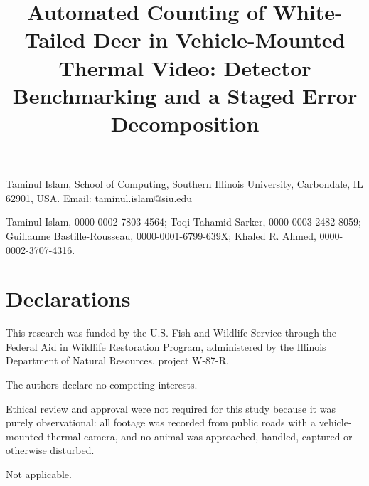 \documentclass[pdflatex,sn-basic,Numbered]{sn-jnl}
\begin{document}
\title[Counting White-Tailed Deer in Vehicle-Mounted Thermal Video]{Automated Counting of White-Tailed Deer in Vehicle-Mounted Thermal Video: Detector Benchmarking and a Staged Error Decomposition}

\author*[1]{ }
\author[1]{ }
\author[2]{ }
\author[2]{ }
\author[1]{ }


\maketitle

\backmatter

Taminul Islam, School of Computing, Southern Illinois University, Carbondale, IL 62901, USA.
Email: taminul.islam@siu.edu

Taminul Islam, 0000-0002-7803-4564; Toqi Tahamid Sarker, 0000-0003-2482-8059;
Guillaume Bastille-Rousseau, 0000-0001-6799-639X; Khaled R. Ahmed, 0000-0002-3707-4316.

\section*{Declarations}

This research was funded by the U.S. Fish and Wildlife Service through the Federal Aid in
Wildlife Restoration Program, administered by the Illinois Department of Natural Resources,
project W-87-R.

The authors declare no competing interests.

Ethical review and approval were not required for this study because it was purely
observational: all footage was recorded from public roads with a vehicle-mounted thermal
camera, and no animal was approached, handled, captured or otherwise disturbed.

Not applicable.
\end{document}
